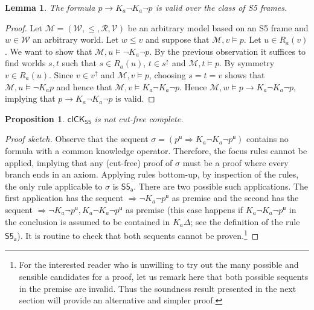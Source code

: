 \documentclass{myifcolog}
\newcommand{\K}{K}
\newcommand{\agi}{a}
\newcommand\CICK{\mathsf{cICK}}
\newcommand{\fw}{\mathcal{M}}
\renewcommand{\u}{\mathsf{u}}
\newcommand{\W}{\mathcal{W}}
\newcommand{\rel}{\mathcal{R}}
\newcommand{\V}{\mathcal{V}}
\newtheorem{lemma}[theorem]{Lemma}
\newtheorem{proposition}[theorem]{Proposition}
\numberwithin{theorem}{section}
\begin{document}
\begin{lemma}
    The formula $p \rightarrow \K_\agi \neg \K_\agi \neg p$ is valid over the class of S5 frames.
\end{lemma}
\begin{proof}
    Let $\fw=(\W, \leq, \rel, \V)$ be an arbitrary model based on an S5 frame and $w \in \W$ an arbitrary world. Let $w \leq v$ and suppose that $\fw,v \models p$. Let $u \in R_\agi(v)$. We want to show that $\fw, u \models \neg \K_\agi \neg p$. By the previous observation it suffices to find worlds $s,t$ such that $s \in R_\agi(u)$, $t \in s^\uparrow$ and $\fw,t \models p$. By symmetry $v \in R_\agi(u)$. Since $v \in v^\uparrow$ and $\fw,v \models p$, choosing $s = t = v$ shows that $\fw, u \models \neg \K_\agi p$ and hence that $\fw,v \models \K_\agi \neg \K_\agi \neg p$. Hence $\fw,w \models p \rightarrow \K_\agi \neg \K_\agi \neg p$, implying that $p \rightarrow \K_\agi \neg \K_\agi \neg p$ is valid.
\end{proof}


\begin{proposition}\label{p: cicks5 not cutfree complete}
    $\CICK_\mathsf{S5}$ is not cut-free complete.
\end{proposition}
\begin{proof}[Proof sketch]
    Observe that the sequent  $\sigma = (p^\u \Rightarrow \K_\agi \neg \K_\agi \neg p^\u)$ contains no formula with a common knowledge operator. Therefore, the focus rules cannot be applied, implying that any (cut-free) proof of $\sigma$ must be a proof where every branch ends in an axiom. Applying rules bottom-up, by inspection of the rules, the only rule applicable to $\sigma$ is $\mathsf{S5_\agi}$. There are two possible such applications. The first application has the sequent $\Rightarrow \neg \K_\agi \neg p^\u$ as premise and the second has the sequent $\Rightarrow \neg \K_\agi \neg p^\u, \K_\agi \neg \K_\agi \neg p^\u$ as premise (this case happens if $\K_\agi \neg \K_\agi \neg p^\u$ in the conclusion is assumed to be contained in $\K_\agi \Delta$; see the definition of the rule $\mathsf{S5_\agi}$). It is routine to check that both sequents cannot be proven.\footnote{For the interested reader who is unwilling to try out the many possible and sensible candidates for a proof, let us remark here that both possible sequents in the premise are invalid. Thus the soundness result presented in the next section will provide an alternative and simpler proof.}\qedhere
\end{proof}
\end{document}
